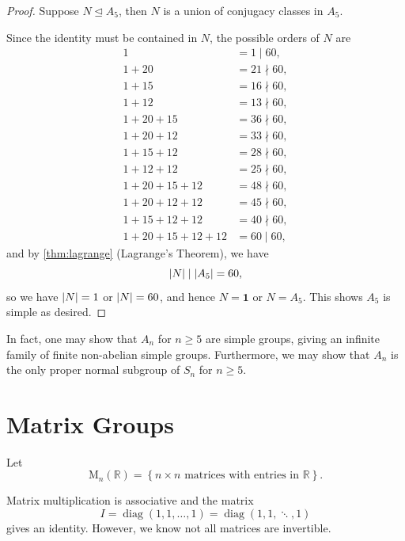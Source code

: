 \documentclass{article}
\theoremstyle{definition}
\theoremstyle{remark}
\DeclarePairedDelimiter{\abs}{\lvert}{\rvert}
\newcommand{\pqty}[1]{\left(#1\right)}
\newcommand{\Bqty}[1]{\left\{#1\right\}}
\newcommand{\normalsub}{\trianglelefteq}
\newcommand{\divides}{\mid}
\newcommand{\notdivides}{\nmid}
\newcommand{\RR}{\mathbb{R}}
\newcommand{\diag}{\operatorname{diag}}
\newcommand{\identityM}{I}
\newcommand{\matrixset}{\mathrm{M}}
\newcommand{\trivialgp}{\mathbf{1}}
\begin{document}
\begin{proof}
    Suppose \(N \normalsub A_5\), then \(N\) is a union of conjugacy classes in \(A_5\).

    Since the identity must be contained in \(N\), the possible orders of \(N\) are
    \begin{align*}
        1 &= 1 \divides 60, \\
        1 + 20 &= 21 \notdivides 60, \\
        1 + 15 &= 16 \notdivides 60, \\
        1 + 12 &= 13 \notdivides 60, \\
        1 + 20 + 15 &= 36 \notdivides 60, \\
        1 + 20 + 12 &= 33 \notdivides 60, \\
        1 + 15 + 12 &= 28 \notdivides 60, \\
        1 + 12 + 12 &= 25 \notdivides 60, \\
        1 + 20 + 15 + 12 &= 48 \notdivides 60, \\
        1 + 20 + 12 + 12 &= 45 \notdivides 60, \\
        1 + 15 + 12 + 12 &= 40 \notdivides 60, \\
        1 + 20 + 15 + 12 + 12 &= 60 \divides 60,
    \end{align*}
    and by \autoref{thm:lagrange} (Lagrange's Theorem), we have
    \[
        \abs{N} \divides \abs{A_5} = 60,
    \]
    so we have \(\abs{N} = 1\) or \(\abs{N} = 60\), and hence \(N = \trivialgp\) or \(N = A_5\). This shows \(A_5\) is simple as desired.
\end{proof}

In fact, one may show that \(A_n\) for \(n \geq 5\) are simple groups, giving an infinite family of finite non-abelian simple groups. Furthermore, we may show that \(A_n\) is the only proper normal subgroup of \(S_n\) for \(n \geq 5\).

\section{Matrix Groups}
\label{sec:matrix-groups}

Let
\[
    \matrixset_n\pqty{\RR} = \Bqty{n \times n \text{ matrices with entries in } \RR}.
\]

Matrix multiplication is associative and the matrix
\[
    \identityM = \diag\pqty{1, 1, \ldots, 1} = \operatorname{diag}\pqty{1, 1, \ddots, 1}
\]
gives an identity. However, we know not all matrices are invertible.
\end{document}
